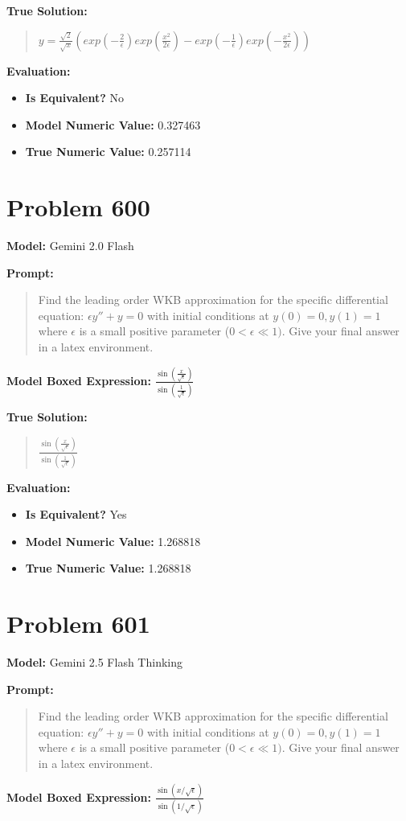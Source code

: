 \documentclass{article}
\begin{document}
\textbf{True Solution:}
\begin{quote}
$y=\frac{\sqrt{2}}{\sqrt{x}}(exp(-\frac{2}{\epsilon})exp(\frac{x^2}{2\epsilon})-exp(-\frac{1}{\epsilon})exp(-\frac{x^2}{2\epsilon}))$
\end{quote}

\textbf{Evaluation:}
\begin{itemize}
\item \textbf{Is Equivalent?} No
\item \textbf{Model Numeric Value:} 0.327463
\item \textbf{True Numeric Value:} 0.257114
\end{itemize}
\vspace{1cm}
\section*{Problem 600}
\textbf{Model:} Gemini 2.0 Flash

\textbf{Prompt:}
\begin{quote}
Find the leading order WKB approximation for the specific differential equation: $\epsilon y'' + y = 0$ with initial conditions at $y(0) = 0, y(1) = 1$ where $\epsilon$ is a small positive parameter ($0 < \epsilon \ll 1)$. Give your final answer in a \boxed latex environment.
\end{quote}
\textbf{Model Boxed Expression:} $\frac{\sin\left(\frac{x}{\sqrt{\epsilon}}\right)}{\sin\left(\frac{1}{\sqrt{\epsilon}}\right)}$

\textbf{True Solution:}
\begin{quote}
$\frac{\sin \left(\frac{x}{\sqrt{\epsilon}}\right)}{\sin \left(\frac{1}{\sqrt{\epsilon}}\right)}$
\end{quote}

\textbf{Evaluation:}
\begin{itemize}
\item \textbf{Is Equivalent?} Yes
\item \textbf{Model Numeric Value:} 1.268818
\item \textbf{True Numeric Value:} 1.268818
\end{itemize}
\vspace{1cm}
\section*{Problem 601}
\textbf{Model:} Gemini 2.5 Flash Thinking

\textbf{Prompt:}
\begin{quote}
Find the leading order WKB approximation for the specific differential equation: $\epsilon y'' + y = 0$ with initial conditions at $y(0) = 0, y(1) = 1$ where $\epsilon$ is a small positive parameter ($0 < \epsilon \ll 1)$. Give your final answer in a \boxed latex environment.
\end{quote}
\textbf{Model Boxed Expression:} $\frac{\sin(x/\sqrt{\epsilon})}{\sin(1/\sqrt{\epsilon})}$
\end{document}
